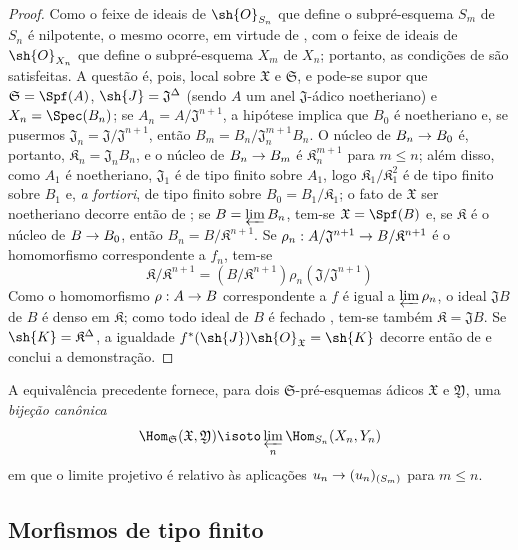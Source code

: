 \documentclass[oneside]{amsart}
\makeatletter
\renewcommand{\leq}{\leqslant}
\newcommand{\ega@arrow}[2]{\mathchoice{#1}{#2}{#2}{#2}}
\renewcommand{\to}{\ega@arrow{\longrightarrow}{\rightarrow}}
\let\EGAOriginalLabel\label
\renewcommand{\label}[1]{\phantomsection\EGAOriginalLabel{#1}}
\makeatother
\begin{document}
\begin{proof}
Como o feixe de ideais de $\sh{O}_{S_n}$ que define o subpré-esquema $S_m$ de $S_n$ é nilpotente, o mesmo ocorre, em virtude de , com o feixe de ideais de $\sh{O}_{X_n}$ que define o subpré-esquema $X_m$ de $X_n$; portanto, as condições de  são satisfeitas.
A questão é, pois, local sobre $\mathfrak{X}$ e $\mathfrak{S}$, e pode-se supor que $\mathfrak{S}=\Spf(A)$, $\sh{J}=\mathfrak{J}^\Delta$ (sendo $A$ um anel $\mathfrak{J}$-ádico noetheriano) e $X_n=\Spec(B_n)$;
se $A_n=A/\mathfrak{J}^{n+1}$, a hipótese implica que $B_0$ é noetheriano e, se pusermos $\mathfrak{J}_n=\mathfrak{J}/\mathfrak{J}^{n+1}$, então $B_m=B_n/\mathfrak{J}_n^{m+1}B_n$.
O núcleo de $B_n\to B_0$ é, portanto, $\mathfrak{K}_n=\mathfrak{J}_nB_n$, e o núcleo de $B_n\to B_m$ é $\mathfrak{K}_n^{m+1}$ para $m\leq n$;
além disso, como $A_1$ é noetheriano, $\mathfrak{J}_1$ é de tipo finito sobre $A_1$, logo $\mathfrak{K}_1/\mathfrak{K}_1^2$ é de tipo finito sobre $B_1$ e, \emph{a fortiori}, de tipo finito sobre $B_0=B_1/\mathfrak{K}_1$;
o fato de $\mathfrak{X}$ ser noetheriano decorre então de ;
se $B=\varprojlim B_n$, tem-se $\mathfrak{X}=\Spf(B)$ e, se $\mathfrak{K}$ é o núcleo de $B\to B_0$, então $B_n=B/\mathfrak{K}^{n+1}$.
Se $\rho_n:A/\mathfrak{J}^{n+1}\to B/\mathfrak{K}^{n+1}$ é o homomorfismo correspondente a $f_n$, tem-se
\[
    \mathfrak{K}/\mathfrak{K}^{n+1} = (B/\mathfrak{K}^{n+1})\rho_n(\mathfrak{J}/\mathfrak{J}^{n+1})
\]
Como o homomorfismo $\rho:A\to B$ correspondente a $f$ é igual a $\varprojlim\rho_n$, o ideal $\mathfrak{J}B$ de $B$ é denso em $\mathfrak{K}$; como todo ideal de $B$ é fechado , tem-se também $\mathfrak{K}=\mathfrak{J}B$.
Se $\sh{K}=\mathfrak{K}^\Delta$, a igualdade $f^*(\sh{J})\sh{O}_\mathfrak{X}=\sh{K}$ decorre então de  e conclui a demonstração.
\end{proof}

\begin{env}[10.12.3.2]
\label{I.10.12.3.2}
A equivalência precedente fornece, para dois $\mathfrak{S}$-pré-esquemas ádicos $\mathfrak{X}$ e $\mathfrak{Y}$, uma \emph{bijeção canônica}
\[
  \Hom_\mathfrak{S}(\mathfrak{X},\mathfrak{Y})\isoto\varprojlim_n\Hom_{S_n}(X_n,Y_n)
\]
em que o limite projetivo é relativo às aplicações $u_n\to(u_n)_{(S_m)}$ para $m\leq n$.
\end{env}

\subsection{Morfismos de tipo finito}
\label{subsection:I.10.13}
\end{document}
